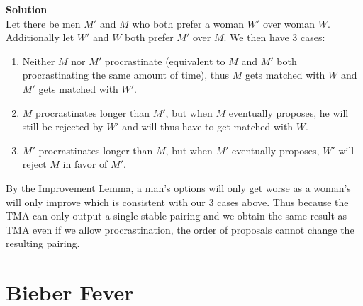 \documentclass[11pt]{article}
\newcommand*{\Question}[1]{\section{#1}}
\newenvironment{Parts}{\begin{enumerate}[label=(\alph*)]}{\end{enumerate}}
\newenvironment{Answer}{\vspace{10pt}\begin{mdframed}\textbf{Solution}\\}{\end{mdframed}\vfill\pagebreak[3]}
\newenvironment{Answer}{\vspace{10pt}}{\vfill\pagebreak[3]}
\begin{document}
\begin{Parts}
\begin{Answer}
Let there be men $M'$ and $M$ who both prefer a woman $W'$ over woman $W$. Additionally let $W'$ and $W$ both prefer $M'$ over $M$. We then have 3 cases:
\begin{enumerate}
\item Neither $M$ nor $M'$ procrastinate (equivalent to $M$ and $M'$ both procrastinating the same amount of time), thus $M$ gets matched with $W$ and $M'$ gets matched with $W'$.
\item $M$ procrastinates longer than $M'$, but when $M$ eventually proposes, he will still be rejected by $W'$ and will thus have to get matched with $W$.
\item $M'$ procrastinates longer than $M$, but when $M'$ eventually proposes, $W'$ will reject $M$ in favor of $M'$.
\end{enumerate}

By the Improvement Lemma, a man's options will only get worse as a woman's will only improve which is consistent with our 3 cases above. Thus because the TMA can only output a single stable pairing and we obtain the same result as TMA even if we allow procrastination, the order of proposals cannot change the resulting pairing.

\end{Answer}

\end{Parts}



\Question{Bieber Fever}
\end{document}
